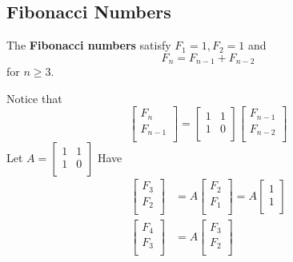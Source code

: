\documentclass{article}
\begin{document}
\subsection{Fibonacci Numbers}
\begin{definition}
  The \textbf{Fibonacci numbers} satisfy $F_1 = 1, F_2 = 1$ and \[
    F_n = F_{n-1} + F_{n-2}
  \] for $n \geq 3$.
\end{definition}
\begin{example}
  Notice that \[
    \begin{bmatrix}
      F_n     \\
      F_{n-1} \\
    \end{bmatrix} =
    \begin{bmatrix}
      1 & 1 \\
      1 & 0 \\
    \end{bmatrix}
    \begin{bmatrix}
      F_{n-1} \\
      F_{n-2} \\
    \end{bmatrix}
  \]
  Let $A =
    \begin{bmatrix}
      1 & 1 \\
      1 & 0 \\
    \end{bmatrix}$
  Have
  \begin{align*}
    \begin{bmatrix}
      F_3 \\
      F_2 \\
    \end{bmatrix} & = A
    \begin{bmatrix}
      F_2 \\
      F_1 \\
    \end{bmatrix} = A
    \begin{bmatrix}
      1 \\1\\
    \end{bmatrix}      \\
    \begin{bmatrix}
      F_4 \\
      F_3 \\
    \end{bmatrix} & = A
    \begin{bmatrix}
      F_3 \\
      F_2 \\

\end{bmatrix}
\end{align*}
\end{example}
\end{document}
